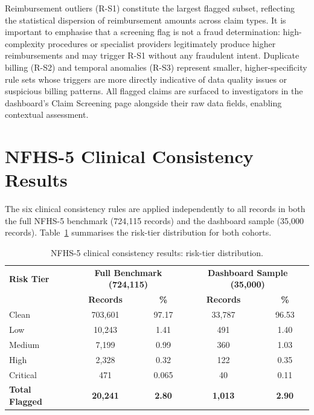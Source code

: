 Reimbursement outliers (R-S1) constitute the largest flagged subset, reflecting the statistical dispersion of reimbursement amounts across claim types. It is important to emphasise that a screening flag is not a fraud determination: high-complexity procedures or specialist providers legitimately produce higher reimbursements and may trigger R-S1 without any fraudulent intent. Duplicate billing (R-S2) and temporal anomalies (R-S3) represent smaller, higher-specificity rule sets whose triggers are more directly indicative of data quality issues or suspicious billing patterns. All flagged claims are surfaced to investigators in the dashboard's Claim Screening page alongside their raw data fields, enabling contextual assessment.

\section{NFHS-5 Clinical Consistency Results}
\label{sec:nfhs-results}

The six clinical consistency rules are applied independently to all records in both the full NFHS-5 benchmark (724,115 records) and the dashboard sample (35,000 records). Table~\ref{tab:nfhs-results} summarises the risk-tier distribution for both cohorts.

\begin{table}[htbp]
\centering
\caption{NFHS-5 clinical consistency results: risk-tier distribution.}
\label{tab:nfhs-results}
\begin{tabular}{@{}lcccc@{}}
\toprule
\textbf{Risk Tier} & \multicolumn{2}{c}{\textbf{Full Benchmark (724,115)}} & \multicolumn{2}{c}{\textbf{Dashboard Sample (35,000)}} \\
& \textbf{Records} & \textbf{\%} & \textbf{Records} & \textbf{\%} \\
\midrule
Clean    & 703,601 & 97.17 & 33,787 & 96.53 \\
Low      & 10,243  & 1.41  &  491   & 1.40  \\
Medium   & 7,199   & 0.99  &  360   & 1.03  \\
High     & 2,328   & 0.32  &  122   & 0.35  \\
Critical & 471     & 0.065 &   40   & 0.11  \\
\midrule
\textbf{Total Flagged} & \textbf{20,241} & \textbf{2.80} & \textbf{1,013} & \textbf{2.90} \\
\bottomrule
\end{tabular}
\end{table}

